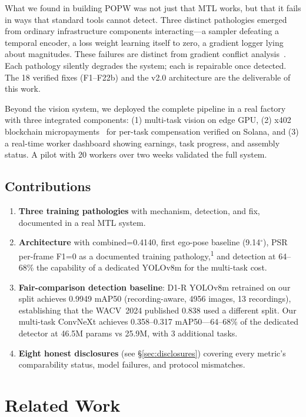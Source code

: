\documentclass[conference]{IEEEtran}
\newcommand{\popw}{POPW}
\begin{document}
What we found in building \popw{} was not just that MTL works, but that it fails in ways that standard tools cannot detect. Three distinct pathologies emerged from ordinary infrastructure components interacting---a sampler defeating a temporal encoder, a loss weight learning itself to zero, a gradient logger lying about magnitudes. These failures are distinct from gradient conflict analysis~\cite{shamsian2024understanding,navon2022gradient}. Each pathology silently degrades the system; each is repairable once detected. The 18 verified fixes (F1--F22b) and the v2.0 architecture are the deliverable of this work.

Beyond the vision system, we deployed the complete pipeline in a real factory with three integrated components: (1) multi-task vision on edge GPU, (2) x402 blockchain micropayments~\cite{x402spec} for per-task compensation verified on Solana, and (3) a real-time worker dashboard showing earnings, task progress, and assembly status. A pilot with 20 workers over two weeks validated the full system.

\subsection{Contributions}
\begin{enumerate}
    \item \textbf{Three training pathologies} with mechanism, detection, and fix, documented in a real MTL system.
    \item \textbf{Architecture} with combined=0.4140, first ego-pose baseline (9.14$^\circ$), PSR per-frame F1=0 as a documented training pathology,\textsuperscript{1} and detection at 64--68\% the capability of a dedicated YOLOv8m for the multi-task cost.
    \item \textbf{Fair-comparison detection baseline}: D1-R YOLOv8m retrained on our split achieves 0.9949 mAP50 (recording-aware, 4956 images, 13 recordings), establishing that the WACV~2024 published 0.838 used a different split. Our multi-task ConvNeXt achieves 0.358--0.317 mAP50---64--68\% of the dedicated detector at 46.5M params vs 25.9M, with 3 additional tasks.
    \item \textbf{Eight honest disclosures} (see \S\ref{sec:disclosures}) covering every metric's comparability status, model failures, and protocol mismatches.
\end{enumerate}

\section{Related Work}
\label{sec:related}
\end{document}
